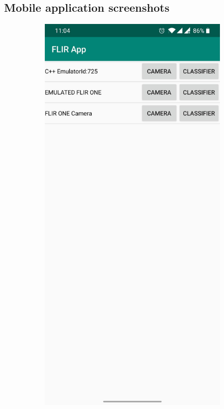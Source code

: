 \documentclass{l4proj}
\begin{document}
\begin{appendices}

\chapter{Mobile application screenshots}

\begin{figure}[ht]
  \centering
  \begin{subfigure}[h!]{0.32\textwidth}
    \includegraphics[width=\textwidth]{images/app/overview.jpg}

\end{subfigure}
\end{figure}
\end{appendices}
\end{document}

